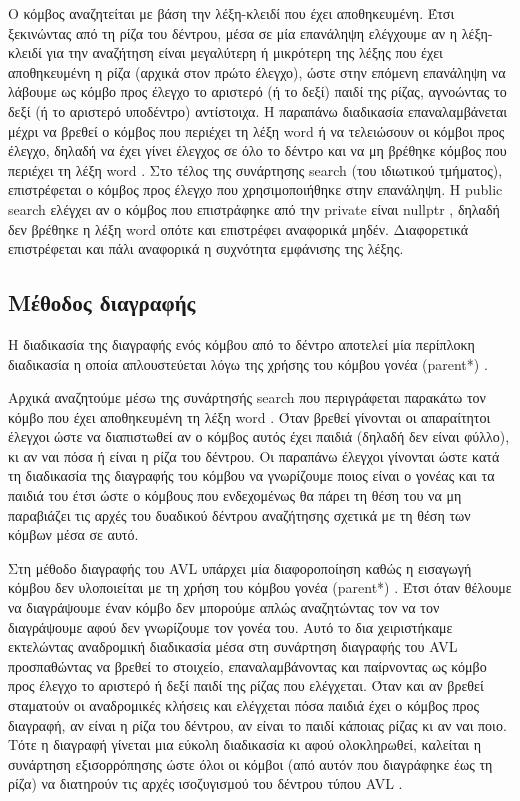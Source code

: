 Ο κόμβος αναζητείται με βάση την λέξη-κλειδί που έχει αποθηκευμένη. Έτσι ξεκινώντας από τη ρίζα του δέντρου, μέσα σε μία επανάληψη ελέγχουμε αν η λέξη-κλειδί για την αναζήτηση είναι μεγαλύτερη ή μικρότερη της λέξης που έχει αποθηκευμένη η ρίζα (αρχικά στον πρώτο έλεγχο), ώστε στην επόμενη επανάληψη να λάβουμε ως κόμβο προς έλεγχο το αριστερό (ή το δεξί) παιδί της ρίζας, αγνοώντας το δεξί (ή το αριστερό υποδέντρο) αντίστοιχα. Η παραπάνω διαδικασία επαναλαμβάνεται μέχρι να βρεθεί ο κόμβος που περιέχει τη λέξη \en word \gr ή να τελειώσουν οι κόμβοι προς έλεγχο, δηλαδή να έχει γίνει έλεγχος σε όλο το δέντρο και να μη βρέθηκε κόμβος που περιέχει τη λέξη \en word \gr. Στο τέλος της συνάρτησης \en search \gr (του ιδιωτικού τμήματος), επιστρέφεται ο κόμβος προς έλεγχο που χρησιμοποιήθηκε στην επανάληψη. H \en public search \gr ελέγχει αν ο κόμβος που επιστράφηκε από την \en private \gr είναι \en nullptr \gr, δηλαδή δεν βρέθηκε η λέξη \en word \gr οπότε και επιστρέφει αναφορικά μηδέν. Διαφορετικά επιστρέφεται και πάλι αναφορικά η συχνότητα εμφάνισης της λέξης.

\subsection{Μέθοδος διαγραφής}

Η διαδικασία της διαγραφής ενός κόμβου από το δέντρο αποτελεί μία περίπλοκη διαδικασία η οποία απλουστεύεται λόγω της χρήσης του κόμβου γονέα \en (parent*) \gr.

Αρχικά αναζητούμε μέσω της συνάρτησής \en search \gr που περιγράφεται παρακάτω τον κόμβο που έχει αποθηκευμένη τη λέξη \en word \gr. Όταν βρεθεί γίνονται οι απαραίτητοι έλεγχοι ώστε να διαπιστωθεί αν ο κόμβος αυτός έχει παιδιά (δηλαδή δεν είναι φύλλο), κι αν ναι πόσα ή είναι η ρίζα του δέντρου. Οι παραπάνω έλεγχοι γίνονται ώστε κατά τη διαδικασία της διαγραφής του κόμβου να γνωρίζουμε ποιος είναι ο γονέας και τα παιδιά του έτσι ώστε ο κόμβους που ενδεχομένως θα πάρει τη θέση του να μη παραβιάζει τις αρχές του δυαδικού δέντρου αναζήτησης σχετικά με τη θέση των κόμβων μέσα σε αυτό.

Στη μέθοδο διαγραφής του \en AVL \gr υπάρχει μία διαφοροποίηση καθώς η εισαγωγή κόμβου δεν υλοποιείται με τη χρήση του κόμβου γονέα \en (parent*) \gr. Έτσι όταν θέλουμε να διαγράψουμε έναν κόμβο δεν μπορούμε απλώς αναζητώντας τον να τον διαγράψουμε αφού δεν γνωρίζουμε τον γονέα του. Αυτό το δια χειριστήκαμε εκτελώντας αναδρομική διαδικασία μέσα στη συνάρτηση διαγραφής του \en AVL \gr προσπαθώντας να βρεθεί το στοιχείο, επαναλαμβάνοντας και παίρνοντας ως κόμβο προς έλεγχο το αριστερό ή δεξί παιδί της ρίζας που ελέγχεται. Όταν και αν βρεθεί σταματούν οι αναδρομικές κλήσεις και ελέγχεται πόσα παιδιά έχει ο κόμβος προς διαγραφή, αν είναι η ρίζα του δέντρου, αν είναι το παιδί κάποιας ρίζας κι αν ναι ποιο. Τότε η διαγραφή γίνεται μια εύκολη διαδικασία κι αφού ολοκληρωθεί, καλείται η συνάρτηση εξισορρόπησης ώστε όλοι οι κόμβοι (από αυτόν που διαγράφηκε έως τη ρίζα) να διατηρούν τις αρχές ισοζυγισμού του δέντρου τύπου \en AVL \gr.

